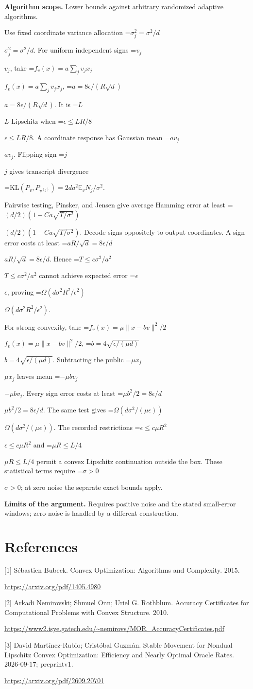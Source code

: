 \documentclass[10pt,a4paper]{article}
\newcommand{\AtlasMath}[1]{\par\begingroup\centering\setbox0=\hbox{$\displaystyle #1$}\ifdim\wd0>1.4\linewidth\typeout{ATLAS WIDE FORMULA: \the\wd0}\fi\ifdim\wd0>\linewidth\resizebox{\linewidth}{!}{\box0}\else\box0\fi\par\endgroup}
\newcommand{\AtlasInlineMath}[1]{\begingroup\setbox0=\hbox{$#1$}\ifdim\wd0>.4\linewidth\endgroup\AtlasMath{#1}\else\endgroup$#1$\fi}
\begin{document}
\textbf{Algorithm scope.} Lower bounds against arbitrary randomized adaptive algorithms.

Use fixed coordinate variance allocation \AtlasInlineMath{\sigma_j^2=\sigma^2/d}. For uniform independent signs \AtlasInlineMath{v_j}, take
\AtlasInlineMath{f_v(x)=a\sum_jv_jx_j}, \AtlasInlineMath{a=8\epsilon/(R\sqrt d)}.
It is \AtlasInlineMath{L}-Lipschitz when \AtlasInlineMath{\epsilon\le LR/8}.
A coordinate response has Gaussian mean \AtlasInlineMath{av_j}. Flipping sign \AtlasInlineMath{j} gives transcript divergence

\AtlasMath{\mathrm{KL}(P_v,P_{v^{(j)}})=2da^2\mathbb E_vN_j/\sigma^2.}

Pairwise testing, Pinsker, and Jensen give average Hamming error at least
\AtlasInlineMath{(d/2)(1-Ca\sqrt{T/\sigma^2})}.
Decode signs oppositely to output coordinates. A sign error costs at least \AtlasInlineMath{aR/\sqrt d=8\epsilon/d}. Hence
\AtlasInlineMath{T\le c\sigma^2/a^2} cannot achieve expected error \AtlasInlineMath{\epsilon}, proving
\AtlasInlineMath{\Omega(d\sigma^2R^2/\epsilon^2)}.

For strong convexity, take \AtlasInlineMath{f_v(x)=\mu\|x-bv\|^2/2},
\AtlasInlineMath{b=4\sqrt{\epsilon/(\mu d)}}.
Subtracting the public \AtlasInlineMath{\mu x_j} leaves mean \AtlasInlineMath{-\mu bv_j}. Every sign error costs at least \AtlasInlineMath{\mu b^2/2=8\epsilon/d}. The same test gives
\AtlasInlineMath{\Omega(d\sigma^2/(\mu\epsilon))}.
The recorded restrictions \AtlasInlineMath{\epsilon\le c\mu R^2} and \AtlasInlineMath{\mu R\le L/4} permit a convex Lipschitz continuation outside the box. These statistical terms require \AtlasInlineMath{\sigma>0}; at zero noise the separate exact bounds apply.

\textbf{Limits of the argument.} Requires positive noise and the stated small-error windows; zero noise is handled by a different construction.

\section{References}
[1] Sébastien Bubeck. Convex Optimization: Algorithms and Complexity. 2015.

\url{https://arxiv.org/pdf/1405.4980}

[2] Arkadi Nemirovski; Shmuel Onn; Uriel G. Rothblum. Accuracy Certificates for Computational Problems with Convex Structure. 2010.

\url{https://www2.isye.gatech.edu/~nemirovs/MOR_AccuracyCertificates.pdf}

[3] David Martínez-Rubio; Cristóbal Guzmán. Stable Movement for Nondual Lipschitz Convex Optimization: Efficiency and Nearly Optimal Oracle Rates. 2026-09-17; preprintv1.

\url{https://arxiv.org/pdf/2609.20701}
\end{document}
